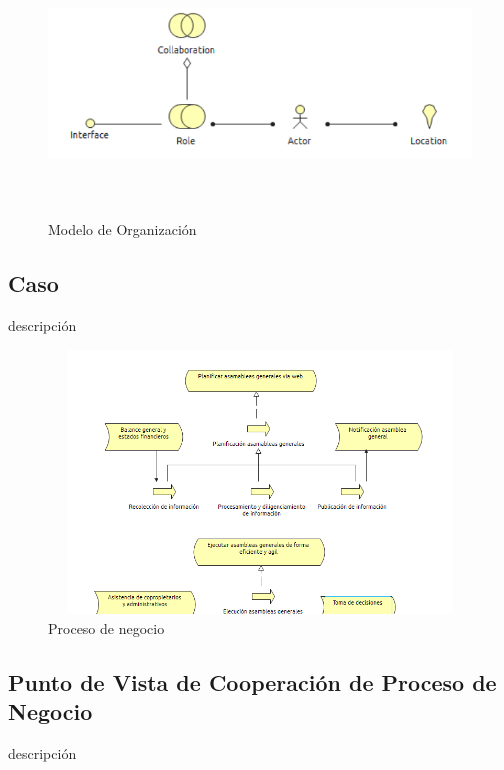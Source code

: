 \begin{figure}[th!]
	\centering
	\includegraphics[width=12cm,height=7cm]{arquitectura/negocio/imgs/m_organizacion}
	\caption{Modelo de Organización}
\end{figure}

\newpage
\subsection{Caso}
descripción

\begin{figure}[th!]
	\centering
	\includegraphics[width=12cm,height=7cm]{arquitectura/negocio/imgs/proceso}
	\caption{Proceso de negocio}
\end{figure}
\newpage

\subsection{Punto de Vista de Cooperación de Proceso de Negocio}
descripción


